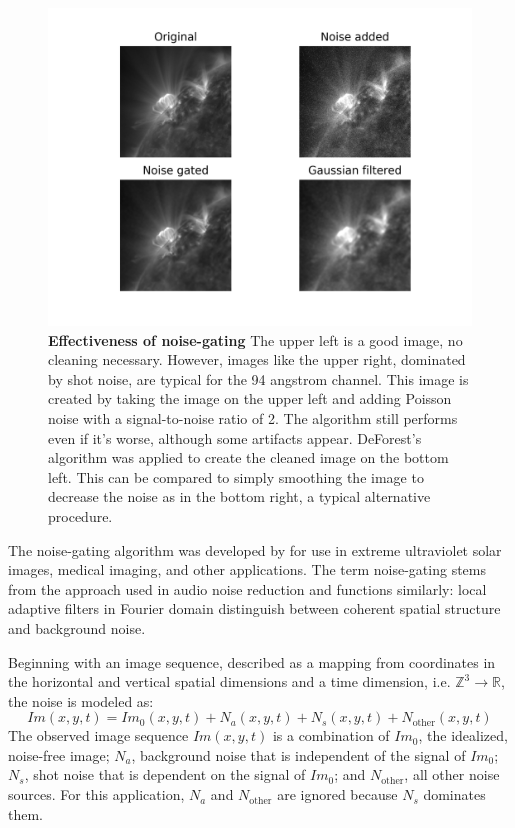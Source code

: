 \documentclass[twoside]{report}
\newcommand{\todo}[1]{{\color{red}{\textbf{#1}}}}
\begin{document}
\begin{figure}[ht]
  \begin{center}
    \includegraphics[scale=0.8]{noise-gate.png}
    \caption{{\bf Effectiveness of noise-gating} The upper left is a good image, no cleaning necessary. However, images like the upper right, dominated by shot noise, are typical for the 94 angstrom channel. This image is created by taking the image on the upper left and adding Poisson noise with a signal-to-noise ratio of 2. The algorithm still performs even if it's worse, although some artifacts appear. DeForest's algorithm was applied to create the cleaned image on the bottom left. This can be compared to simply smoothing the image to decrease the noise as in the bottom right, a typical alternative procedure.}
    \label{fig:noise-gate-example}
 \end{center}
\end{figure}

The noise-gating algorithm was developed by \cite{deforest:2017} for use in extreme ultraviolet solar images, medical imaging, and other applications. The term noise-gating stems from the approach used in audio noise reduction and functions similarly: local adaptive filters in Fourier domain distinguish between coherent spatial structure and background noise. 

Beginning with an image sequence, described as a mapping from coordinates in the horizontal and vertical spatial dimensions and a time dimension, i.e. $\mathbb{Z}^3 \rightarrow \mathbb{R}$, the noise is modeled as:
\[Im(x,y,t) = Im_0(x,y,t) + N_a(x,y,t) + N_s(x,y,t) + N_{\text{other}}(x,y,t) \]
The observed image sequence $Im(x,y,t)$ is a combination of $Im_0$, the idealized, noise-free image; $N_a$, background noise that is independent of the signal of $Im_0$; $N_s$, shot noise that is dependent on the signal of $Im_0$; and $N_{\text{other}}$, all other noise sources. For this application, $N_a$ and $N_{\text{other}}$ are ignored because $N_s$ dominates them. \todo{finish copying from notes}
\end{document}
